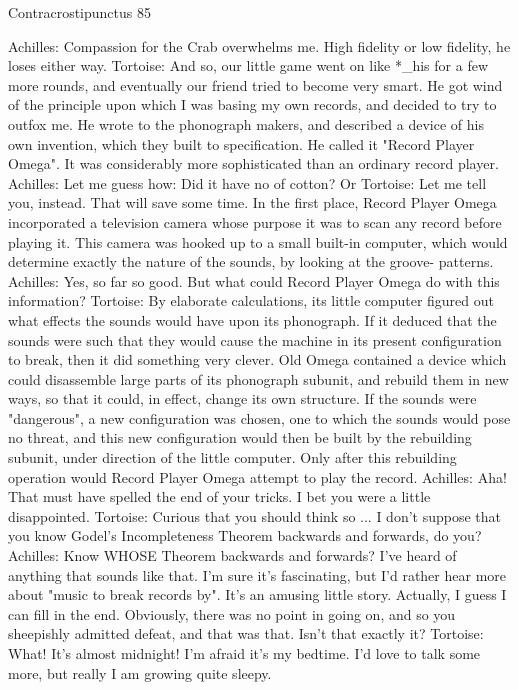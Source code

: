 Contracrostipunctus                                                                      85

Achilles: Compassion for the Crab overwhelms me. High fidelity or low fidelity, he loses
       either way.
Tortoise: And so, our little game went on like *\_his for a few more rounds, and
       eventually our friend tried to become very smart. He got wind of the principle
       upon which I was basing my own records, and decided to try to outfox me. He
       wrote to the phonograph makers, and described a device of his own invention,
       which they built to specification. He called it "Record Player Omega". It was
       considerably more sophisticated than an ordinary record player.
Achilles: Let me guess how: Did it have no of cotton? Or
Tortoise: Let me tell you, instead. That will save some time. In the first place, Record
       Player Omega incorporated a television camera whose purpose it was to scan any
       record before playing it. This camera was hooked up to a small built-in computer,
       which would determine exactly the nature of the sounds, by looking at the groove-
       patterns.
Achilles: Yes, so far so good. But what could Record Player Omega do with this
       information?
Tortoise: By elaborate calculations, its little computer figured out what effects the sounds
       would have upon its phonograph. If it deduced that the sounds were such that they
       would cause the machine in its present configuration to break, then it did
       something very clever. Old Omega contained a device which could disassemble
       large parts of its phonograph subunit, and rebuild them in new ways, so that it
       could, in effect, change its own structure. If the sounds were "dangerous", a new
       configuration was chosen, one to which the sounds would pose no threat, and this
       new configuration would then be built by the rebuilding subunit, under direction
       of the little computer. Only after this rebuilding operation would Record Player
       Omega attempt to play the record.
Achilles: Aha! That must have spelled the end of your tricks. I bet you were a little
       disappointed.
Tortoise: Curious that you should think so ... I don't suppose that you know Godel's
       Incompleteness Theorem backwards and forwards, do you?
Achilles: Know WHOSE Theorem backwards and forwards? I've
heard of anything that sounds like that. I'm sure it's fascinating, but I'd rather hear more
       about "music to break records by". It's an amusing little story. Actually, I guess I
       can fill in the end. Obviously, there was no point in going on, and so you
       sheepishly admitted defeat, and that was that. Isn't that exactly it?
Tortoise: What! It's almost midnight! I'm afraid it's my bedtime. I'd love to talk some
       more, but really I am growing quite sleepy.




